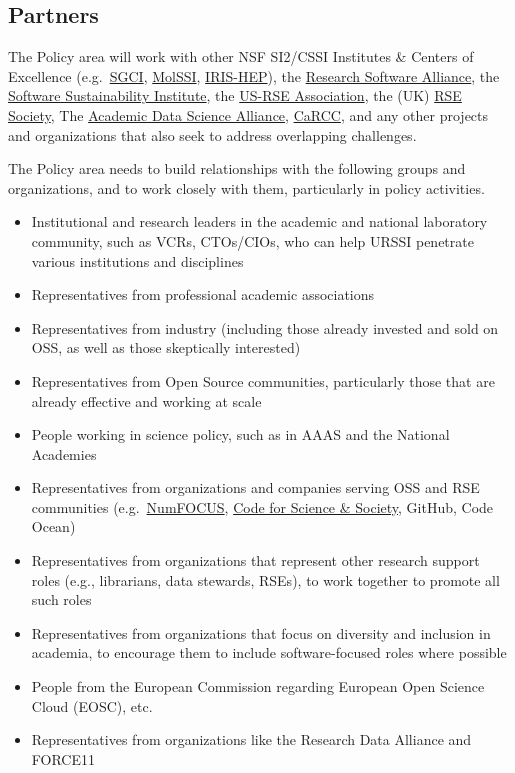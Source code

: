 \documentclass[
]{book}
\begin{document}
\hypertarget{partners}{%
\subsection{Partners}\label{partners}}

The Policy area will work with other NSF SI2/CSSI Institutes \& Centers of Excellence
(e.g.~\href{https://sciencegateways.org}{SGCI}, \href{https://molssi.org}{MolSSI}, \href{https://iris-hep.org}{IRIS-HEP}),
the \href{https://www.researchsoft.org}{Research Software Alliance},
the \href{https://software.ac.uk}{Software Sustainability Institute},
the \href{https://us-rse.org}{US-RSE Association},
the (UK) \href{https://society-rse.org}{RSE Society},
The \href{https://www.academicdatascience.org}{Academic Data Science Alliance},
\href{https://carcc.org}{CaRCC},
and any other projects and organizations that also seek to address overlapping challenges.

The Policy area needs to build relationships with the following groups and organizations, and
to work closely with them, particularly in policy activities.

\begin{itemize}
\item
  Institutional and research leaders in the academic and national laboratory community, such as
  VCRs, CTOs/CIOs, who can help URSSI penetrate various institutions and disciplines
\item
  Representatives from professional academic associations
\item
  Representatives from industry (including those already invested and sold on OSS, as well as
  those skeptically interested)
\item
  Representatives from Open Source communities, particularly those that are already effective and working at scale
\item
  People working in science policy, such as in AAAS and the National Academies
\item
  Representatives from organizations and companies serving OSS and RSE communities
  (e.g.~\href{https://numfocus.org}{NumFOCUS}, \href{https://codeforscience.org}{Code for Science \& Society}, GitHub, Code Ocean)
\item
  Representatives from organizations that represent other research support roles
  (e.g., librarians, data stewards, RSEs), to work together to promote all such roles
\item
  Representatives from organizations that focus on diversity and inclusion in academia,
  to encourage them to include software-focused roles where possible
\item
  People from the European Commission regarding European Open Science Cloud (EOSC), etc.
\item
  Representatives from organizations like the Research Data Alliance and FORCE11
\end{itemize}
\end{document}
